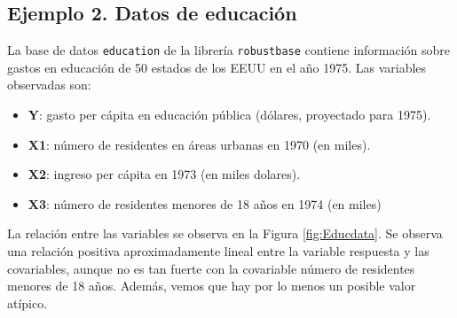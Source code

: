 \documentclass[
]{article}
\newenvironment{Shaded}{\begin{snugshade}}{\end{snugshade}}
\newcommand{\CommentTok}[1]{\textcolor[rgb]{0.56,0.35,0.01}{\textit{#1}}}
\newcommand{\DecValTok}[1]{\textcolor[rgb]{0.00,0.00,0.81}{#1}}
\newcommand{\FunctionTok}[1]{\textcolor[rgb]{0.00,0.00,0.00}{#1}}
\newcommand{\NormalTok}[1]{#1}
\newcommand{\OtherTok}[1]{\textcolor[rgb]{0.56,0.35,0.01}{#1}}
\newcommand{\SpecialCharTok}[1]{\textcolor[rgb]{0.00,0.00,0.00}{#1}}
\newcommand{\StringTok}[1]{\textcolor[rgb]{0.31,0.60,0.02}{#1}}
\providecommand{\tightlist}{%
  \setlength{\itemsep}{0pt}\setlength{\parskip}{0pt}}
\begin{document}
\hypertarget{ejemplo-2.-datos-de-educaciuxf3n}{%
\subsection*{Ejemplo 2. Datos de educación}\label{ejemplo-2.-datos-de-educaciuxf3n}}

La base de datos \texttt{education} de la librería \texttt{robustbase} contiene información sobre gastos en educación de 50 estados de los EEUU en el año 1975. Las variables observadas son:

\begin{itemize}
\tightlist
\item
  \textbf{Y}: gasto per cápita en educación pública (dólares, proyectado para 1975).
\item
  \textbf{X1}: número de residentes en áreas urbanas en 1970 (en miles).
\item
  \textbf{X2}: ingreso per cápita en 1973 (en miles dolares).
\item
  \textbf{X3}: número de residentes menores de 18 años en 1974 (en miles)
\end{itemize}

La relación entre las variables se observa en la Figura \ref{fig:Educdata}. Se observa una relación positiva aproximadamente lineal entre la variable respuesta y las covariables, aunque no es tan fuerte con la covariable número de residentes menores de 18 años. Además, vemos que hay por lo menos un posible valor atípico.

\begin{Shaded}
\end{Shaded}
\end{document}
